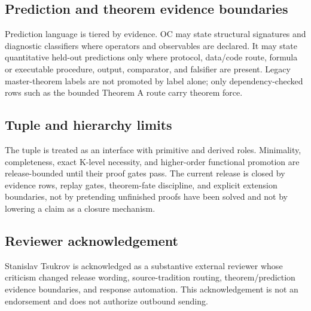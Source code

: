 \subsection{Prediction and theorem evidence boundaries}
Prediction language is tiered by evidence. OC may state structural signatures and diagnostic classifiers where operators and observables are declared. It may state quantitative held-out predictions only where protocol, data/code route, formula or executable procedure, output, comparator, and falsifier are present. Legacy master-theorem labels are not promoted by label alone; only dependency-checked rows such as the bounded Theorem A route carry theorem force.

\subsection{Tuple and hierarchy limits}
The tuple is treated as an interface with primitive and derived roles. Minimality, completeness, exact K-level necessity, and higher-order functional promotion are release-bounded until their proof gates pass. The current release is closed by evidence rows, replay gates, theorem-fate discipline, and explicit extension boundaries, not by pretending unfinished proofs have been solved and not by lowering a claim as a closure mechanism.

\subsection{Reviewer acknowledgement}
Stanislav Tsukrov is acknowledged as a substantive external reviewer whose criticism changed release wording, source-tradition routing, theorem/prediction evidence boundaries, and response automation. This acknowledgement is not an endorsement and does not authorize outbound sending.

\clearpage
